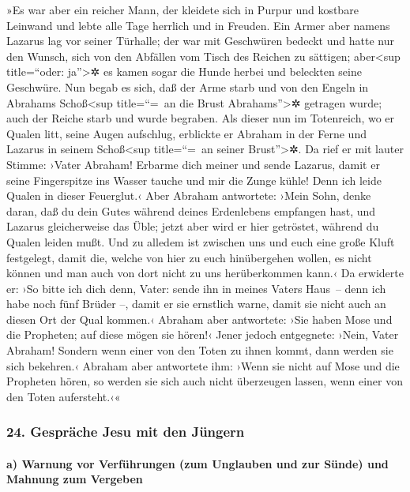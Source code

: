  »Es war aber ein reicher Mann, der kleidete sich in
Purpur und kostbare Leinwand und lebte alle Tage herrlich und in
Freuden.  Ein Armer aber namens Lazarus lag vor seiner
Türhalle; der war mit Geschwüren bedeckt  und hatte nur
den Wunsch, sich von den Abfällen vom Tisch des Reichen zu sättigen;
aber\textless sup title=``oder: ja''\textgreater✲ es kamen sogar die
Hunde herbei und beleckten seine Geschwüre.  Nun begab es
sich, daß der Arme starb und von den Engeln in Abrahams
Schoß\textless sup title=``=~an die Brust Abrahams''\textgreater✲
getragen wurde; auch der Reiche starb und wurde begraben.
 Als dieser nun im Totenreich, wo er Qualen litt, seine
Augen aufschlug, erblickte er Abraham in der Ferne und Lazarus in seinem
Schoß\textless sup title=``=~an seiner Brust''\textgreater✲.
 Da rief er mit lauter Stimme: ›Vater Abraham! Erbarme
dich meiner und sende Lazarus, damit er seine Fingerspitze ins Wasser
tauche und mir die Zunge kühle! Denn ich leide Qualen in dieser
Feuerglut.‹  Aber Abraham antwortete: ›Mein Sohn, denke
daran, daß du dein Gutes während deines Erdenlebens empfangen hast, und
Lazarus gleicherweise das Üble; jetzt aber wird er hier getröstet,
während du Qualen leiden mußt.  Und zu alledem ist
zwischen uns und euch eine große Kluft festgelegt, damit die, welche von
hier zu euch hinübergehen wollen, es nicht können und man auch von dort
nicht zu uns herüberkommen kann.‹  Da erwiderte er: ›So
bitte ich dich denn, Vater: sende ihn in meines Vaters Haus~--
 denn ich habe noch fünf Brüder --, damit er sie
ernstlich warne, damit sie nicht auch an diesen Ort der Qual kommen.‹
 Abraham aber antwortete: ›Sie haben Mose und die
Propheten; auf diese mögen sie hören!‹  Jener jedoch
entgegnete: ›Nein, Vater Abraham! Sondern wenn einer von den Toten zu
ihnen kommt, dann werden sie sich bekehren.‹  Abraham
aber antwortete ihm: ›Wenn sie nicht auf Mose und die Propheten hören,
so werden sie sich auch nicht überzeugen lassen, wenn einer von den
Toten aufersteht.‹«

\hypertarget{gespruxe4che-jesu-mit-den-juxfcngern}{%
\subsubsection{24. Gespräche Jesu mit den
Jüngern}\label{gespruxe4che-jesu-mit-den-juxfcngern}}

\hypertarget{a-warnung-vor-verfuxfchrungen-zum-unglauben-und-zur-suxfcnde-und-mahnung-zum-vergeben}{%
\paragraph{a) Warnung vor Verführungen (zum Unglauben und zur Sünde) und
Mahnung zum
Vergeben}\label{a-warnung-vor-verfuxfchrungen-zum-unglauben-und-zur-suxfcnde-und-mahnung-zum-vergeben}}

